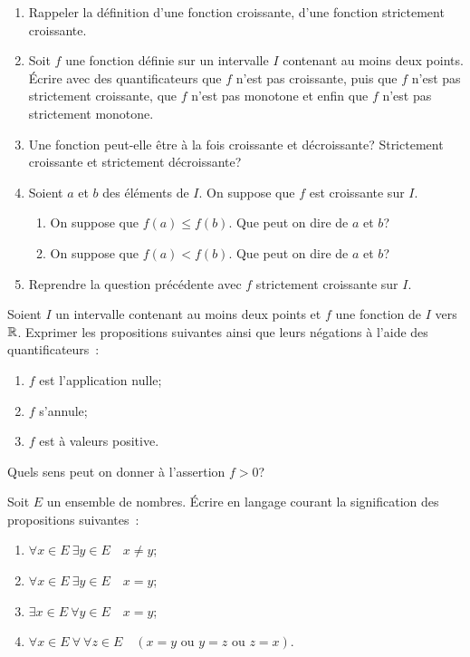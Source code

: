 \begin{exercice}
  \begin{enumerate}
    \item Rappeler la définition d'une fonction croissante, d'une fonction
      strictement croissante.
    \item Soit \(f\) une fonction définie sur un intervalle \(I\) contenant au 
      moins deux points. Écrire avec des quantificateurs que \(f\) n'est pas 
      croissante, puis que \(f\) n'est pas strictement croissante, que \(f\) 
      n'est pas monotone et enfin que \(f\) n'est pas strictement monotone.
    \item Une fonction peut-elle être à la fois croissante et décroissante?
      Strictement croissante et strictement décroissante?
    \item Soient \(a\) et \(b\) des éléments de \(I\). On suppose que \(f\) est
      croissante sur \(I\).
      \begin{enumerate}
        \item On suppose que \(f(a) \leqslant f(b)\). Que peut on dire de \(a\) 
          et \(b\)?
        \item On suppose que \(f(a) < f(b)\). Que peut on dire de \(a\) et 
          \(b\)?
      \end{enumerate}
    \item Reprendre la question précédente avec \(f\) strictement croissante sur 
      \(I\).
  \end{enumerate}
\end{exercice}

\begin{exercice}
  Soient \(I\) un intervalle contenant au moins deux points et \(f\) une 
  fonction de \(I\) vers \(\mathbb{R}\). Exprimer les propositions suivantes ainsi que 
  leurs négations à l'aide des quantificateurs~:
  \begin{enumerate}
    \item \(f\) est l'application nulle;
    \item \(f\) s'annule;
    \item \(f\) est à valeurs positive.
  \end{enumerate}
  Quels sens peut on donner à l'assertion \(f>0\)?
\end{exercice}

\begin{exercice}
  Soit \(E\) un ensemble de nombres. Écrire en langage courant la signification 
  des propositions suivantes~:
  \begin{enumerate}
    \item \(\forall x \in E \ \exists y \in E \quad x \neq y\);
    \item \(\forall x \in E \ \exists y \in E \quad x = y\);
    \item \(\exists x \in E \ \forall y \in E \quad x = y\);
    \item \(\forall x \in E \ \forall \ \forall z \in E \quad (x=y \textrm{~ou~}
      y=z \textrm{~ou~} z=x)\).
  \end{enumerate}
\end{exercice}

